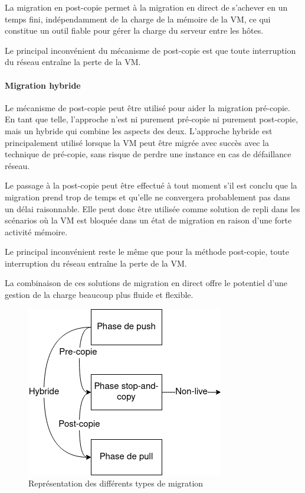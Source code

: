 La migration en post-copie permet à la migration en direct de s'achever en un temps fini, indépendamment de la charge de la mémoire de la VM, ce qui constitue un outil fiable pour gérer la charge du serveur entre les hôtes.

Le principal inconvénient du mécanisme de post-copie est que toute interruption du réseau entraîne la perte de la VM.

\paragraph*{Migration hybride}
Le mécanisme de post-copie peut être utilisé pour aider la migration pré-copie.
En tant que telle, l'approche n'est ni purement pré-copie ni purement post-copie, mais un hybride qui combine les aspects des deux.
L'approche hybride est principalement utilisé lorsque la VM peut être migrée avec succès avec la technique de pré-copie, sans risque de perdre une instance en cas de défaillance réseau.

Le passage à la post-copie peut être effectué à tout moment s'il est conclu que la migration prend trop de temps et qu'elle ne convergera probablement pas dans un délai raisonnable.
Elle peut donc être utilisée comme solution de repli dans les scénarios où la VM est bloquée dans un état de migration en raison d'une forte activité mémoire.

Le principal inconvénient reste le même que pour la méthode post-copie, toute interruption du réseau entraîne la perte de la VM.

La combinaison de ces solutions de migration en direct offre le potentiel d'une gestion de la charge beaucoup plus fluide et flexible.


\begin{figure}[H]
    \centering
    \includegraphics[scale=0.5]{include/typemig.png}
    \caption{Représentation des différents types de migration}
\end{figure}

